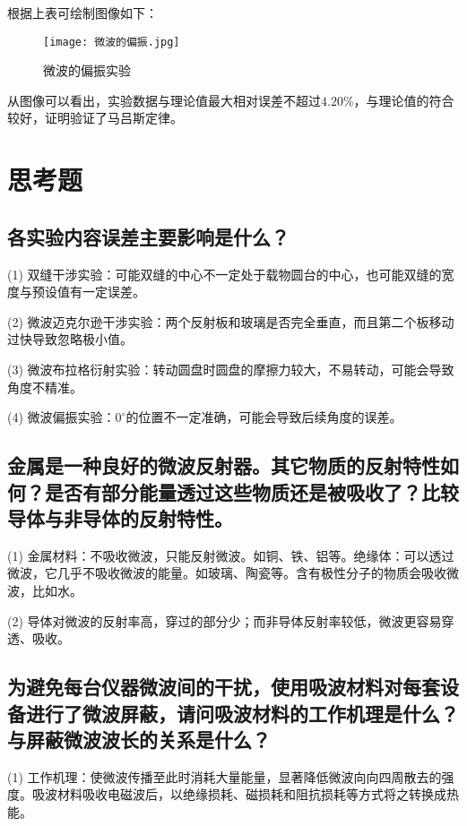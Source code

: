 \documentclass[11pt]{article}
\begin{document}
根据上表可绘制图像如下：

\begin{figure}[H]
  \centering
  \texttt{[image: 微波的偏振.jpg]}
  \caption{微波的偏振实验}
\end{figure}

从图像可以看出，实验数据与理论值最大相对误差不超过$4.20\%$，与理论值的符合较好，证明验证了马吕斯定律。

\section{思考题}

\subsection{各实验内容误差主要影响是什么？}

(1) 双缝干涉实验：可能双缝的中心不一定处于载物圆台的中心，也可能双缝的宽度与预设值有一定误差。

(2) 微波迈克尔逊干涉实验：两个反射板和玻璃是否完全垂直，而且第二个板移动过快导致忽略极小值。

(3) 微波布拉格衍射实验：转动圆盘时圆盘的摩擦力较大，不易转动，可能会导致角度不精准。

(4) 微波偏振实验：$0^\circ$的位置不一定准确，可能会导致后续角度的误差。

\subsection{金属是一种良好的微波反射器。其它物质的反射特性如何？是否有部分能量透过这些物质还是被吸收了？比较导体与非导体的反射特性。}

(1) 金属材料：不吸收微波，只能反射微波。如铜、铁、铝等。绝缘体：可以透过微波，它几乎不吸收微波的能量。如玻璃、陶瓷等。含有极性分子的物质会吸收微波，比如水。

(2) 导体对微波的反射率高，穿过的部分少；而非导体反射率较低，微波更容易穿透、吸收。

\subsection{为避免每台仪器微波间的干扰，使用吸波材料对每套设备进行了微波屏蔽，请问吸波材料的工作机理是什么？与屏蔽微波波长的关系是什么？}

(1) 工作机理：使微波传播至此时消耗大量能量，显著降低微波向向四周散去的强度。吸波材料吸收电磁波后，以绝缘损耗、磁损耗和阻抗损耗等方式将之转换成热能。
\end{document}
